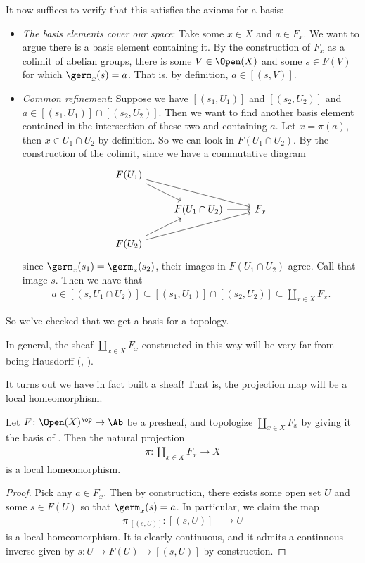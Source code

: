\documentclass[11pt]{book}
\begin{document}
It now suffices to verify that this satisfies the axioms for a basis:
\begin{itemize}
    \item[\textbf{B1}] \emph{The basis elements cover our space}: Take some $x\in X$ and $a\in F_x$. We want to argue there is a basis element containing it. By the construction of $F_x$ as a colimit of abelian groups, there is some $V \in \Open(X)$ and some $s\in F(V)$ for which $\germ_x(s) = a$. That is, by definition, $a\in \left[ (s,V) \right]$.
    \item[\textbf{B2}] \emph{Common refinement}: Suppose we have $[(s_1,U_1)]$ and $[(s_2,U_2)]$ and $a\in \left[ (s_1,U_1) \right] \cap \left[ (s_2,U_2) \right]$. Then we want to find another basis element contained in the intersection of these two and containing $a$. Let $x = \pi(a)$, then $x\in U_1 \cap U_2$ by definition. So we can look in $F(U_1\cap U_2)$. By the construction of the colimit, since we have a commutative diagram
\[ \begin{tikzcd}
    F(U_1)\ar[dr]\ar[drr] &  & \\
     & F(U_1\cap U_2)\rar & F_x\\
    F(U_2)\ar[ur]\ar[urr] &  & 
\end{tikzcd} \]
since $\germ_x(s_1) = \germ_x(s_2)$, their images in $F(U_1\cap U_2)$ agree. Call that image $s$. Then we have that
\begin{align*}
    a\in \left[ (s,U_1\cap U_2) \right] \subseteq \left[ (s_1,U_1) \right]\cap \left[ (s_2,U_2) \right] \subseteq \amalg_{x\in X}F_x.
\end{align*}
\end{itemize}
So we've checked that we get a basis for a topology.

\begin{remark} In general, the sheaf $\amalg_{x\in X}F_x$ constructed in this way will be very far from being Hausdorff (\cite[p.~3]{Bredon-sheaf}, \cite{FAC}).
\end{remark}

It turns out we have in fact built a sheaf! That is, the projection map will be a local homeomorphism.

\begin{lemma} Let $F \colon \Open(X)^\op \to \Ab$ be a presheaf, and topologize $\amalg_{x\in X} F_x$ by giving it the basis of . Then the natural projection
\begin{align*}
    \pi \colon \amalg_{x\in X} F_x \to X
\end{align*}
is a local homeomorphism.
\end{lemma}
\begin{proof} Pick any $a\in F_x$. Then by construction, there exists some open set $U$ and some $s\in F(U)$ so that $\germ_x(s) = a$. In particular, we claim the map
\begin{align*}
    \pi_{|[(s,U)]} \colon [(s,U)] &\to U
\end{align*}
is a local homeomorphism. It is clearly continuous, and it admits a continuous inverse given by $s \colon U \to F(U) \to [(s,U)]$ by construction.
\end{proof}
\end{document}
